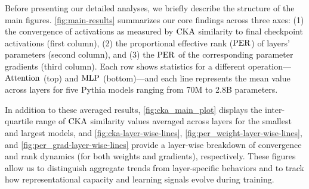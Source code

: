 Before presenting our detailed analyses, we briefly describe the structure of the main figures. \cref{fig:main-results} summarizes our core findings across three axes: (1) the convergence of activations as measured by $\mathrm{CKA}$ similarity to final checkpoint activations (first column), (2) the proportional effective rank ($\mathrm{PER}$) of layers' parameters (second column), and (3) the $\mathrm{PER}$ of the corresponding parameter gradients (third column). Each row shows statistics for a different operation—$\mathrm{Attention}$ (top) and $\mathrm{MLP}$ (bottom)—and each line represents the mean value across layers for five Pythia models ranging from 70M to 2.8B parameters.

In addition to these averaged results, \cref{fig:cka_main_plot} displays the inter-quartile range of $\mathrm{CKA}$ similarity values averaged across layers for the smallest and largest models, and \cref{fig:cka-layer-wise-lines}, \cref{fig:per_weight-layer-wise-lines}, and \cref{fig:per_grad-layer-wise-lines} provide a layer-wise breakdown of convergence and rank dynamics (for both weights and gradients), respectively. These figures allow us to distinguish aggregate trends from layer-specific behaviors and to track how representational capacity and learning signals evolve during training.

\clearpage

